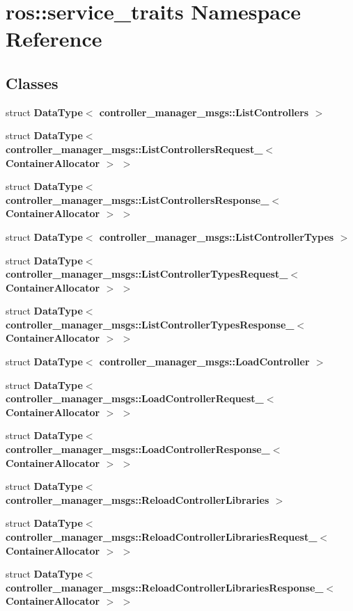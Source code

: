 \section{ros\-:\-:service\-\_\-traits \-Namespace \-Reference}
\label{namespaceros_1_1service__traits}
\subsection*{\-Classes}
\begin{DoxyCompactItemize}
\item 
struct {\bf \-Data\-Type$<$ controller\-\_\-manager\-\_\-msgs\-::\-List\-Controllers $>$}
\item 
struct {\bf \-Data\-Type$<$ controller\-\_\-manager\-\_\-msgs\-::\-List\-Controllers\-Request\-\_\-$<$ Container\-Allocator $>$ $>$}
\item 
struct {\bf \-Data\-Type$<$ controller\-\_\-manager\-\_\-msgs\-::\-List\-Controllers\-Response\-\_\-$<$ Container\-Allocator $>$ $>$}
\item 
struct {\bf \-Data\-Type$<$ controller\-\_\-manager\-\_\-msgs\-::\-List\-Controller\-Types $>$}
\item 
struct {\bf \-Data\-Type$<$ controller\-\_\-manager\-\_\-msgs\-::\-List\-Controller\-Types\-Request\-\_\-$<$ Container\-Allocator $>$ $>$}
\item 
struct {\bf \-Data\-Type$<$ controller\-\_\-manager\-\_\-msgs\-::\-List\-Controller\-Types\-Response\-\_\-$<$ Container\-Allocator $>$ $>$}
\item 
struct {\bf \-Data\-Type$<$ controller\-\_\-manager\-\_\-msgs\-::\-Load\-Controller $>$}
\item 
struct {\bf \-Data\-Type$<$ controller\-\_\-manager\-\_\-msgs\-::\-Load\-Controller\-Request\-\_\-$<$ Container\-Allocator $>$ $>$}
\item 
struct {\bf \-Data\-Type$<$ controller\-\_\-manager\-\_\-msgs\-::\-Load\-Controller\-Response\-\_\-$<$ Container\-Allocator $>$ $>$}
\item 
struct {\bf \-Data\-Type$<$ controller\-\_\-manager\-\_\-msgs\-::\-Reload\-Controller\-Libraries $>$}
\item 
struct {\bf \-Data\-Type$<$ controller\-\_\-manager\-\_\-msgs\-::\-Reload\-Controller\-Libraries\-Request\-\_\-$<$ Container\-Allocator $>$ $>$}
\item 
struct {\bf \-Data\-Type$<$ controller\-\_\-manager\-\_\-msgs\-::\-Reload\-Controller\-Libraries\-Response\-\_\-$<$ Container\-Allocator $>$ $>$}

\end{DoxyCompactItemize}
